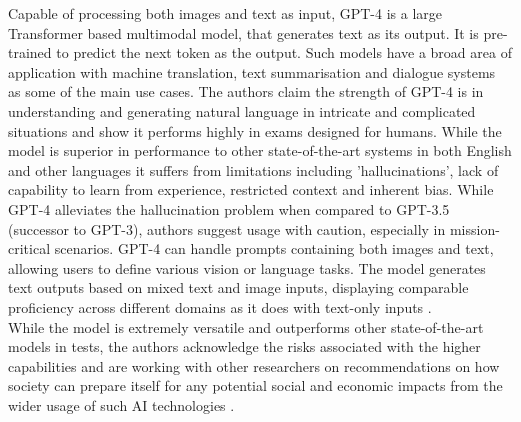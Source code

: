 Capable of processing both images and text as input, GPT-4 \cite{openaiGPT4TechnicalReport2023} is a large Transformer based multimodal model, that generates text as its output. It is pre-trained to predict the next token as the output. Such models have a broad area of application with machine translation, text summarisation and dialogue systems as some of the main use cases. The authors \cite{openaiGPT4TechnicalReport2023} claim the strength of GPT-4 is in understanding and generating natural language in intricate and complicated situations and show it performs highly in exams designed for humans. While the model is superior in performance to other state-of-the-art systems in both English and other languages it suffers from limitations including 'hallucinations', lack of capability to learn from experience,  restricted context and inherent bias. While GPT-4 alleviates the hallucination problem when compared to GPT-3.5 (successor to GPT-3), authors suggest usage with caution, especially in mission-critical scenarios. GPT-4 can handle prompts containing both images and text, allowing users to define various vision or language tasks. The model generates text outputs based on mixed text and image inputs, displaying comparable proficiency across different domains as it does with text-only inputs \cite{openaiGPT4TechnicalReport2023}. \\

While the model is extremely versatile and outperforms other state-of-the-art models in tests, the authors acknowledge the risks associated with the higher capabilities and are working with other researchers on recommendations on how society can prepare itself for any potential social and economic impacts from the wider usage of such AI technologies \cite{openaiGPT4TechnicalReport2023}.

